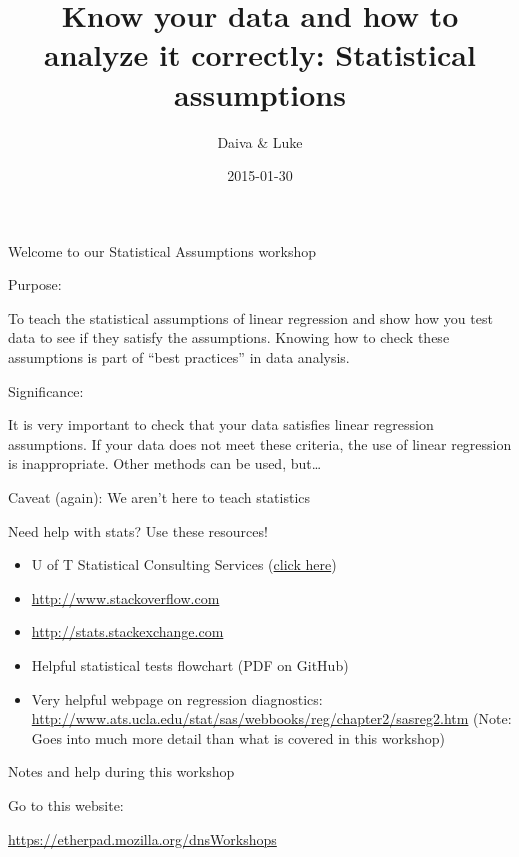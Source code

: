 \documentclass[ignorenonframetext,xcolor=dvipsnames]{beamer}
\title{Know your data and how to analyze it correctly: Statistical assumptions}
\author{Daiva \& Luke}
\date{2015-01-30}
\begin{document}
\frame{\titlepage}

\begin{frame}{Welcome to our Statistical Assumptions workshop}

\begin{block}{Purpose:}

To teach the statistical assumptions of linear regression and show how
you test data to see if they satisfy the assumptions. Knowing how to
check these assumptions is part of ``best practices'' in data analysis.

\end{block}

\begin{block}{Significance:}

It is very important to check that your data satisfies linear regression
assumptions. If your data does not meet these criteria, the use of
linear regression is inappropriate. Other methods can be used,
but\ldots{}

\end{block}

\end{frame}

\begin{frame}{Caveat (again): We aren't here to teach statistics}

Need help with stats? Use these resources!

\begin{itemize}
\item
  U of T Statistical Consulting Services
  (\href{http://www.utstat.toronto.edu/wordpress/?page_id=25}{click
  here})
\item
  \url{http://www.stackoverflow.com}
\item
  \url{http://stats.stackexchange.com}
\item
  Helpful statistical tests flowchart (PDF on GitHub)
\item
  Very helpful webpage on regression diagnostics:
  \url{http://www.ats.ucla.edu/stat/sas/webbooks/reg/chapter2/sasreg2.htm}
  (Note: Goes into much more detail than what is covered in this
  workshop)
\end{itemize}

\end{frame}

\begin{frame}{Notes and help during this workshop}

Go to this website:

\url{https://etherpad.mozilla.org/dnsWorkshops}

\end{frame}
\end{document}
